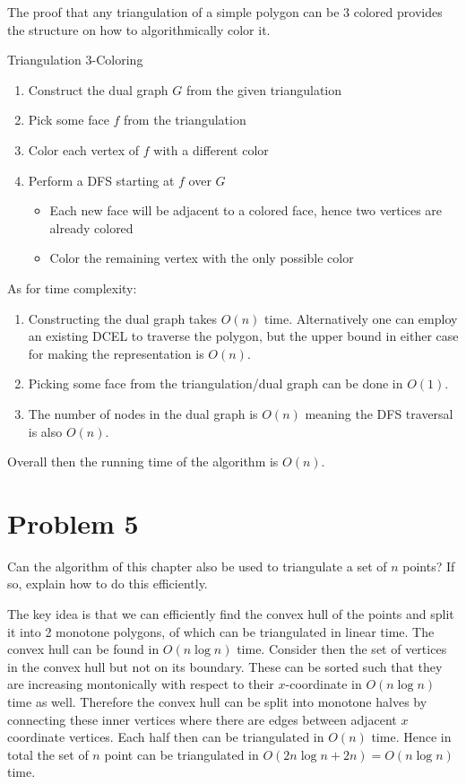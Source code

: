 \documentclass[12pt]{extarticle}
\begin{document}
\begin{solution}
    The proof that any triangulation of a simple polygon can be $3$ colored provides the structure on how to algorithmically color it.
    \begin{algorithm}[H]
        \caption{Triangulation 3-Coloring}
        \begin{enumerate}
            \item Construct the dual graph $G$ from the given triangulation
            \item Pick some face $f$ from the triangulation
            \item Color each vertex of $f$ with a different color
            \item Perform a DFS starting at $f$ over $G$
                \begin{itemize}
                    \item Each new face will be adjacent to a colored face, hence two vertices are already colored
                    \item Color the remaining vertex with the only possible color
                \end{itemize}
        \end{enumerate}
    \end{algorithm}
    As for time complexity:
    \begin{enumerate}
        \item Constructing the dual graph takes $O(n)$ time. Alternatively one can employ an existing DCEL to traverse the polygon, but the upper bound in either case for making the representation is $O(n)$.
        \item Picking some face from the triangulation/dual graph can be done in $O(1)$.
        \item The number of nodes in the dual graph is $O(n)$ meaning the DFS traversal is also $O(n)$.
    \end{enumerate}
    Overall then the running time of the algorithm is $O(n)$.
\end{solution}

\section*{Problem 5}
Can the algorithm of this chapter also be used to triangulate a set of $n$ points? If so, explain how to do this efficiently.

\begin{solution}
    The key idea is that we can efficiently find the convex hull of the points and split it into 2 monotone polygons, of which can be triangulated in linear time. The convex hull can be found in $O(n \log n)$ time. Consider then the set of vertices in the convex hull but not on its boundary. These can be sorted such that they are increasing montonically with respect to their $x$-coordinate in $O(n \log n)$ time as well. Therefore the convex hull can be split into monotone halves by connecting these inner vertices where there are edges between adjacent $x$ coordinate vertices. Each half then can be triangulated in $O(n)$ time. Hence in total the set of $n$ point can be triangulated in $O(2 n \log n + 2n) = O(n \log n)$ time.
\end{solution}
\end{document}
